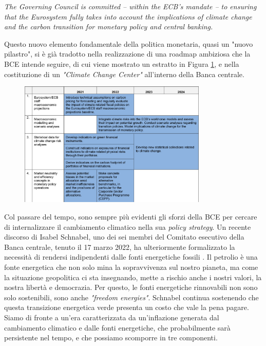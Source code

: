 \begin{displayquote}
	\small\singlespacing\textit{The Governing Council is committed – within the ECB’s mandate – to ensuring that the Eurosystem fully takes into account the implications of climate change and the carbon transition for monetary policy and central banking.} \parencite{ECB:overview_strategy_review}
\end{displayquote}

Questo nuovo elemento fondamentale della politica monetaria, quasi un "nuovo pilastro", si è già tradotto nella realizzazione di una roadmap ambiziosa che la BCE intende seguire, di cui viene mostrato un estratto in Figura \ref{ECB:roadmap_inflation}, e nella costituzione di un \textit{"Climate Change Center"} all'interno della Banca centrale.

\begin{figure}[h]
	\centering
	\includegraphics[width=0.80\textwidth]{img/inflation_roadmap.pdf}
	\caption{}
	\label{ECB:roadmap_inflation}
\end{figure}

Col passare del tempo, sono sempre più evidenti gli sforzi della BCE per cercare di internalizzare il cambiamento climatico nella sua \textit{policy strategy}. Un recente discorso di Isabel Schnabel, uno dei sei membri del Comitato esecutivo della Banca centrale, tenuto il 17 marzo 2022, ha ulteriormente formalizzato la necessità di rendersi indipendenti dalle fonti energetiche fossili \parencite{ECB:speech_isabel}. Il petrolio è una fonte energetica che non solo mina la sopravvivenza sul nostro pianeta, ma come la situazione geopolitica ci sta insegnando, mette a rischio anche i nostri valori, la nostra libertà e democrazia. Per questo, le fonti energetiche rinnovabili non sono solo sostenibili, sono anche \textit{"freedom energies"}. Schnabel continua sostenendo che questa transizione energetica verde presenta un costo che vale la pena pagare. Siamo di fronte a un'era caratterizzata da un'inflazione generata dal cambiamento climatico e dalle fonti energetiche, che probabilmente sarà persistente nel tempo, e che possiamo scomporre in tre componenti.

